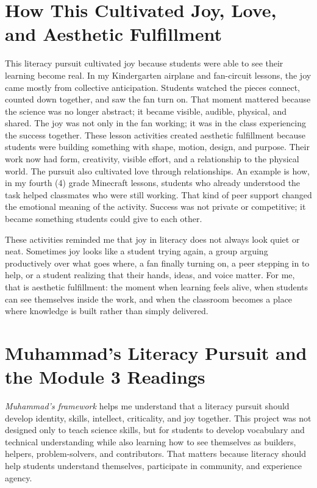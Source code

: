 \documentclass[11pt]{article}
\begin{document}
\section*{How This Cultivated Joy, Love, and Aesthetic Fulfillment}

This literacy pursuit cultivated joy because students were able to see their learning become real. In my Kindergarten airplane and fan-circuit lessons, the joy came mostly from collective anticipation. Students watched the pieces connect, counted down together, and saw the fan turn on. That moment mattered because the science was no longer abstract; it became visible, audible, physical, and shared. The joy was not only in the fan working; it was in the class experiencing the success together. These lesson activities created aesthetic fulfillment because students were building something with shape, motion, design, and purpose. Their work now had form, creativity, visible effort, and a relationship to the physical world. The pursuit also cultivated love through relationships. An example is how, in my fourth (4) grade Minecraft lessons, students who already understood the task helped classmates who were still working. That kind of peer support changed the emotional meaning of the activity. Success was not private or competitive; it became something students could give to each other.

These activities reminded me that joy in literacy does not always look quiet or neat. Sometimes joy looks like a student trying again, a group arguing productively over what goes where, a fan finally turning on, a peer stepping in to help, or a student realizing that their hands, ideas, and voice matter. For me, that is aesthetic fulfillment: the moment when learning feels alive, when students can see themselves inside the work, and when the classroom becomes a place where knowledge is built rather than simply delivered.

\section*{Muhammad's Literacy Pursuit and the Module 3 Readings}

\textit{Muhammad's framework} helps me understand that a literacy pursuit should develop identity, skills, intellect, criticality, and joy together. This project was not designed only to teach science skills, but for students to develop vocabulary and technical understanding while also learning how to see themselves as builders, helpers, problem-solvers, and contributors. That matters because literacy should help students understand themselves, participate in community, and experience agency.
\end{document}
